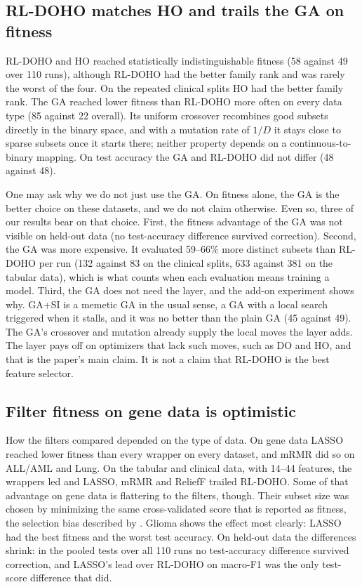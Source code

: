 \documentclass[pdflatex,sn-basic]{sn-jnl}
\begin{document}
\subsection{RL-DOHO matches HO and trails the GA on fitness}
RL-DOHO and HO reached statistically indistinguishable fitness (58 against 49 over 110 runs), although RL-DOHO had the better family rank and was rarely the worst of the four. On the repeated clinical splits HO had the better family rank. The GA reached lower fitness than RL-DOHO more often on every data type (85 against 22 overall). Its uniform crossover recombines good subsets directly in the binary space, and with a mutation rate of $1/D$ it stays close to sparse subsets once it starts there; neither property depends on a continuous-to-binary mapping. On test accuracy the GA and RL-DOHO did not differ (48 against 48).

One may ask why we do not just use the GA. On fitness alone, the GA is the better choice on these datasets, and we do not claim otherwise. Even so, three of our results bear on that choice. First, the fitness advantage of the GA was not visible on held-out data (no test-accuracy difference survived correction). Second, the GA was more expensive. It evaluated 59--66\% more distinct subsets than RL-DOHO per run (132 against 83 on the clinical splits, 633 against 381 on the tabular data), which is what counts when each evaluation means training a model. Third, the GA does not need the layer, and the add-on experiment shows why. GA+SI is a memetic GA in the usual sense, a GA with a local search triggered when it stalls, and it was no better than the plain GA (45 against 49). The GA's crossover and mutation already supply the local moves the layer adds. The layer pays off on optimizers that lack such moves, such as DO and HO, and that is the paper's main claim. It is not a claim that RL-DOHO is the best feature selector.

\subsection{Filter fitness on gene data is optimistic}
How the filters compared depended on the type of data. On gene data LASSO reached lower fitness than every wrapper on every dataset, and mRMR did so on ALL/AML and Lung. On the tabular and clinical data, with 14--44 features, the wrappers led and LASSO, mRMR and ReliefF trailed RL-DOHO. Some of that advantage on gene data is flattering to the filters, though. Their subset size was chosen by minimizing the same cross-validated score that is reported as fitness, the selection bias described by \citet{ambroise2002}. Glioma shows the effect most clearly: LASSO had the best fitness and the worst test accuracy. On held-out data the differences shrink: in the pooled tests over all 110 runs no test-accuracy difference survived correction, and LASSO's lead over RL-DOHO on macro-F1 was the only test-score difference that did.
\end{document}
